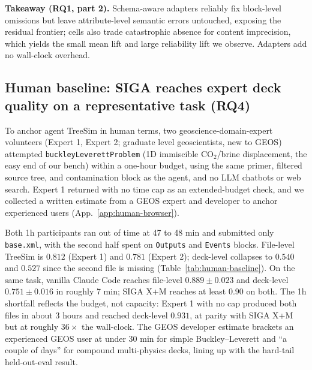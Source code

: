 \documentclass{article}
\begin{document}
\textbf{Takeaway (RQ1, part 2).} Schema-aware adapters reliably fix block-level omissions but leave attribute-level semantic errors untouched, exposing the residual frontier; cells also trade catastrophic absence for content imprecision, which yields the small mean lift and large reliability lift we observe. Adapters add no wall-clock overhead.

\subsection{Human baseline: SIGA reaches expert deck quality on a representative task (RQ4)}
\label{subsec:human-baseline}

To anchor agent TreeSim in human terms, two geoscience-domain-expert volunteers (Expert 1, Expert 2; graduate level geoscientists, new to GEOS) attempted \texttt{buckleyLeverettProblem} (1D immiscible CO$_2$/brine displacement, the easy end of our bench) within a one-hour budget, using the same primer, filtered source tree, and contamination block as the agent, and no LLM chatbots or web search. Expert 1 returned with no time cap as an extended-budget check, and we collected a written estimate from a GEOS expert and developer to anchor experienced users (App.~\ref{app:human-browser}).

Both 1h participants ran out of time at 47 to 48 min and submitted only \texttt{base.xml}, with the second half spent on \texttt{Outputs} and \texttt{Events} blocks. File-level TreeSim is $0.812$ (Expert 1) and $0.781$ (Expert 2); deck-level collapses to $0.540$ and $0.527$ since the second file is missing (Table~\ref{tab:human-baseline}). On the same task, vanilla Claude Code reaches file-level $0.889 \pm 0.023$ and deck-level $0.751 \pm 0.016$ in roughly 7 min; SIGA X+M reaches at least $0.90$ on both. The 1h shortfall reflects the budget, not capacity: Expert 1 with no cap produced both files in about 3 hours and reached deck-level $\mathbf{0.931}$, at parity with SIGA X+M but at roughly $36\times$ the wall-clock. The GEOS developer estimate brackets an experienced GEOS user at under 30 min for simple Buckley--Leverett and ``a couple of days'' for compound multi-physics decks, lining up with the hard-tail held-out-eval result.
\end{document}
